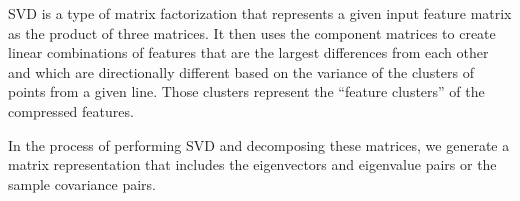 \documentclass[11pt, table]{diazessay} %
\begin{document}
\begin{sloppypar}
SVD is a type of matrix factorization that represents a given input feature matrix as the product of three matrices.  It then uses the component matrices to create linear combinations of features that are the largest differences from each other and which are directionally different based on the variance of the clusters of points from a given line.   Those clusters represent the “feature clusters” of the compressed features.  

In the process of performing SVD and decomposing these matrices, we generate a matrix representation that includes the eigenvectors and eigenvalue pairs or the sample covariance pairs. 


\newcommand{\vect}{\mathbf}
\newcommand{\nul}{\operatorname{Nul}}
\newcommand{\col}{\operatorname{Col}}
\newcommand{\row}{\operatorname{Row}}
\begin{figure}[H]
\centering{%
\small
\[
\renewcommand{\arraystretch}{.3}
   A= U\Sigma V^T=
  \begin{matrix}
    \underbrace{\left[\begin{matrix}\vect u_1 & \vect u_2 & \dots & \vect u_r\end{matrix}\right.}& 
    \underbrace{\left.\begin{matrix}\vect u_{r+1} & \dots &  \vect u_m\end{matrix}\right]}\\
    \col A & \nul A^T
  \end{matrix}
  \begin{bmatrix}
      \sigma_1 & 0 & \dots & 0 & 0 & \dots & 0 \\
         0 & \sigma_2  & \dots & 0 & 0 & \dots & 0 \\
         \dots& & & & &  \\
         0 & 0 & \dots & \sigma_r  & 0 & \dots & 0 \\
         0 & 0 & \dots & 0 & 0 & \dots & 0 \\
         \dots& & & & &  \\
         0 & 0 & \dots & 0 & 0 & \dots & 0 
  \end{bmatrix}
  \begin{bmatrix}
    \vect v_1^T \\ \vect v_2^T \\ \dots \\ \vect v_r^T \\
    \vect v_{r+1}^T \\ \dots \\ \vect v_n^T
  \end{bmatrix}
\]}
\end{figure}
\end{sloppypar}
\end{document}
